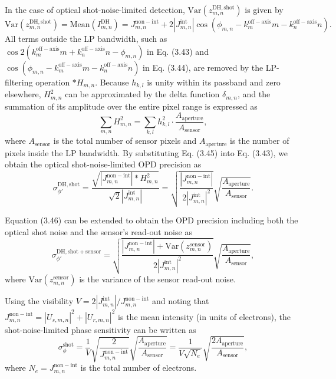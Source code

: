 In the case of optical shot-noise-limited detection, $\mathrm{Var}(z_{m,n}^{\mathrm{DH,shot}})$ is given by
\begin{equation}
\mathrm{Var}(z_{m,n}^{\mathrm{DH,shot}}) = \mathrm{Mean}(I_{m,n}^{\mathrm{DH}}) = J_{m,n}^{\mathrm{non-int}} + 2|J_{m,n}^{\mathrm{int}}| \cos(\phi_{m,n} - k_m^{\mathrm{off-axis}}m - k_n^{\mathrm{off-axis}}n).
\end{equation}
All terms outside the LP bandwidth, such as $\cos 2(k_m^{\mathrm{off-axis}}m + k_n^{\mathrm{off-axis}}n - \phi_{m,n})$ in Eq. (3.43) and $\cos(\phi_{m,n} - k_m^{\mathrm{off-axis}}m - k_n^{\mathrm{off-axis}}n)$ in Eq. (3.44), are removed by the LP-filtering operation $\ast H_{m,n}$. Because $h_{k,l}$ is unity within its passband and zero elsewhere, $H_{m,n}^2$ can be approximated by the delta function $\delta_{m,n}$, and the summation of its amplitude over the entire pixel range is expressed as
\begin{equation}
\sum_{m,n} H_{m,n}^2 = \sum_{k,l} h_{k,l}^2 \cdot \frac{A_{\mathrm{aperture}}}{A_{\mathrm{sensor}}},
\end{equation}
where $A_{\mathrm{sensor}}$ is the total number of sensor pixels and $A_{\mathrm{aperture}}$ is the number of pixels inside the LP bandwidth. By substituting Eq. (3.45) into Eq. (3.43), we obtain the optical shot-noise-limited OPD precision as
\begin{equation}
\sigma_{\phi'}^{\mathrm{DH,shot}} = \frac{\sqrt{|J_{m,n}^{\mathrm{non-int}}| \ast H_{m,n}^2}}{\sqrt{2}|J_{m,n}^{\mathrm{int}}|} = \sqrt{\frac{|J_{m,n}^{\mathrm{non-int}}|}{2|J_{m,n}^{\mathrm{int}}|^2}} \sqrt{\frac{A_{\mathrm{aperture}}}{A_{\mathrm{sensor}}}}.
\end{equation}

Equation (3.46) can be extended to obtain the OPD precision including both the optical shot noise and the sensor's read-out noise as
\begin{equation}
\sigma_{\phi'}^{\mathrm{DH,shot+sensor}} = \sqrt{\frac{|J_{m,n}^{\mathrm{non-int}}| + \mathrm{Var}(z_{m,n}^{\mathrm{sensor}})}{2|J_{m,n}^{\mathrm{int}}|^2}} \sqrt{\frac{A_{\mathrm{aperture}}}{A_{\mathrm{sensor}}}},
\end{equation}
where $\mathrm{Var}(z_{m,n}^{\mathrm{sensor}})$ is the variance of the sensor read-out noise.

Using the visibility $V = 2|J_{m,n}^{\mathrm{int}}|/J_{m,n}^{\mathrm{non-int}}$ and noting that $J_{m,n}^{\mathrm{non-int}} = |U_{s,m,n}|^2 + |U_{r,m,n}|^2$ is the mean intensity (in units of electrons), the shot-noise-limited phase sensitivity can be written as
\begin{equation}
\sigma_{\phi}^{\mathrm{shot}} = \frac{1}{V} \sqrt{\frac{2}{J_{m,n}^{\mathrm{non-int}}}} \sqrt{\frac{A_{\mathrm{aperture}}}{A_{\mathrm{sensor}}}} = \frac{1}{V\sqrt{N_e}} \sqrt{\frac{2A_{\mathrm{aperture}}}{A_{\mathrm{sensor}}}},
\end{equation}
where $N_e = J_{m,n}^{\mathrm{non-int}}$ is the total number of electrons.

